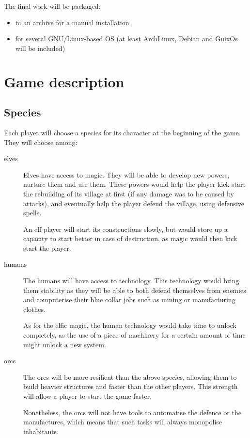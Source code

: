 \documentclass{article}
\begin{document}
The final work will be packaged:
\begin{itemize}
	\item in an archive for a manual installation
	\item for several GNU/Linux-based OS
	(at least ArchLinux, Debian and GuixOs will be included)
\end{itemize}



\section{Game description}
\subsection{Species}
Each player will choose a species for its character at the beginning of the game.
They will choose among:
\begin{description}
	\item[elves]
	Elves have access to magic. They will be able to develop new powers, nurture
	them and use them.
	These powers would help the player kick start the rebuilding of its village at first
	(if any damage was to be caused by attacks), and eventually help the player
	defend the village, using defensive spells.

	An elf player will start its constructions slowly, but would store up a
	capacity to start better in case of destruction, as magic would then kick
	start the player.

	\item[humans]
	The humans will have access to technology. This technology would bring them stability
	as they will be able to both defend themselves from enemies and computerise their blue
	collar jobs such as mining or manufacturing clothes.

	As for the elfic magic, the human technology would take time to unlock completely,
	as the use of a piece of machinery for a certain amount of time might unlock a
	new system.

	\item[orcs]
	The orcs will be more resilient than the above species, allowing them to build
	heavier structures and faster than the other players. This strength will allow a
	player to start the game faster.

	Nonetheless, the orcs will not have tools to automatise the defence or the manufactures,
	which means that such tasks will always monopolise inhabitants.
\end{description}
\end{document}
